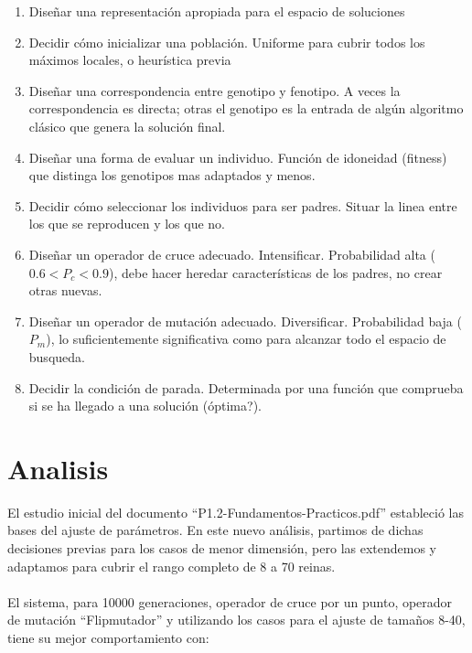 \documentclass[12pt]{article}
\begin{document}
    \begin{enumerate}
    \item Diseñar una representación apropiada para el espacio de soluciones
    \item Decidir cómo inicializar una población. Uniforme para cubrir todos los máximos locales, o heurística previa
    \item Diseñar una correspondencia entre genotipo y fenotipo. A veces la correspondencia es directa; otras el genotipo es la entrada de algún algoritmo clásico que genera la solución final.
    \item Diseñar una forma de evaluar un individuo. Función de idoneidad (fitness) que distinga los genotipos mas adaptados y menos.
    \item Decidir cómo seleccionar los individuos para ser padres. Situar la linea entre los que se reproducen y los que no.
    \item Diseñar un operador de cruce adecuado. Intensificar. Probabilidad alta ($0.6 < P_c < 0.9$), debe hacer heredar características de los padres, no crear otras nuevas.
    \item Diseñar un operador de mutación adecuado. Diversificar. Probabilidad baja ($P_m$), lo suficientemente significativa como para alcanzar todo el espacio de busqueda.
    \item Decidir la condición de parada. Determinada por una función que comprueba si se ha llegado a una solución (óptima?).
    \end{enumerate}

    \section{Analisis}

    El estudio inicial del documento ``P1.2-Fundamentos-Practicos.pdf'' estableció las bases del ajuste de parámetros. En este nuevo análisis, partimos de dichas decisiones previas para los casos de menor dimensión, pero las extendemos y adaptamos para cubrir el rango completo de 8 a 70 reinas.\\\\
    El sistema, para 10000 generaciones, operador de cruce por un punto, operador de mutación ``Flipmutador'' y utilizando los casos para el ajuste de tamaños 8-40, tiene su mejor comportamiento con:
\end{document}
